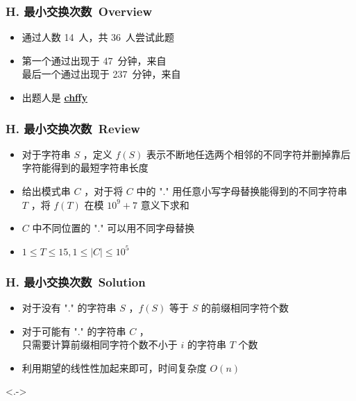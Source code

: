 \documentclass[notheorems]{beamer}
\newcommand{\zhProbH}{最小交换次数}	\newcommand{\AuthProbH}{\textbf{\underline{\href{http://codeforces.com/profile/chffy}{chffy}}}}
\newcommand{\AccInProbH}{14}	\newcommand{\SubInProbH}{36}	\newcommand{\RatInProbH}{38.89\%}
\newcommand{\FirPenInProbH}{47}		\newcommand{\FirPerInProbH}{\NONE}
\newcommand{\LasPenInProbH}{237}	\newcommand{\LasPerInProbH}{\NONE}
\begin{document}
\begin{frame}[label = ProbH]
\frametitle{H. \zhProbH\ Overview}
\begin{spacing}{2.0} \large
\begin{itemize}[<+->]
\item 通过人数 \AccInProbH\ 人，共 \SubInProbH\ 人尝试此题
\item 第一个通过出现于 \FirPenInProbH\ 分钟，来自 \FirPerInProbH\ 
\\ 最后一个通过出现于 \LasPenInProbH\ 分钟，来自 \LasPerInProbH\ 
\item 出题人是 \AuthProbH\ 
\end{itemize}
\end{spacing}
\end{frame}
\begin{frame}
\frametitle{H. \zhProbH\ Review}
\begin{spacing}{2.0} \large
\begin{itemize}[<+->]
\item 对于字符串 $S$ ，定义 $f(S)$ 表示不断地任选两个相邻的不同字符并删掉靠后字符能得到的最短字符串长度
\item 给出模式串 $C$ ，对于将 $C$ 中的 $\text{"."}$ 用任意小写字母替换能得到的不同字符串 $T$ ，将 $f(T)$ 在模 $10^9 + 7$ 意义下求和
\item $C$ 中不同位置的 $\text{"."}$ 可以\alert{用不同字母替换}
\item $1 \leq T \leq 15, 1 \leq |C| \leq 10^5$
\end{itemize}
\end{spacing}
\end{frame}
\begin{frame}
\frametitle{H. \zhProbH\ Solution}
\begin{spacing}{2.0} \large
\begin{itemize}[<+->]
\item 对于没有 $\text{"."}$ 的字符串 $S$ ，$f(S)$ 等于 $S$ 的\alert{前缀相同字符个数}
\item 对于可能有 $\text{"."}$ 的字符串 $C$ ， \\ 只需要计算前缀相同字符个数不小于 $i$ 的字符串 $T$ 个数
\item 利用期望的线性性加起来即可，时间复杂度 $O(n)$
\end{itemize}
\end{spacing}
\visible<.->{\hyperlink{Overview}{}}
\end{frame}
\end{document}

